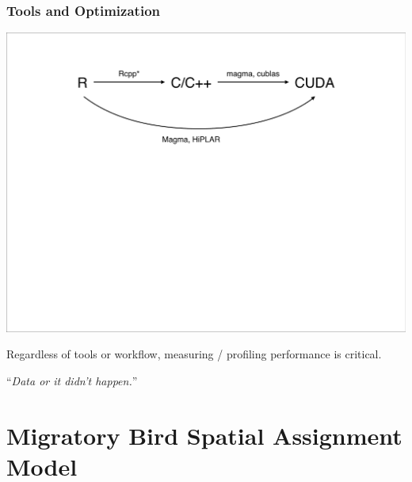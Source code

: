 \documentclass[t]{beamer}\usepackage[]{graphicx}\usepackage[]{color}
\begin{document}
\begin{frame}
\frametitle{Tools and Optimization}

\vfill

\begin{center}
\includegraphics[width=\textwidth]{figs/diagram.pdf}
\end{center}

\vfill

Regardless of tools or workflow, measuring / profiling performance is critical.

\vfill \pause

\begin{center}
``\textit{Data or it didn't happen.}''
\end{center}


\end{frame}


\section{Migratory Bird Spatial Assignment Model}

\end{document}
